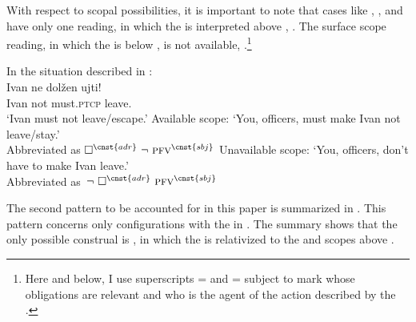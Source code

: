 \documentclass[output=paper,newtxmath,colorlinks,citecolor=brown]{langsci/langscibook}
\begin{document}
       \z

\noindent With respect to scopal possibilities, it is important to note that cases like , , and  have only one reading, in which the  is interpreted above , . The surface scope reading, in which the  is below , is not available, .\footnote{Here and below, I use superscripts  =  and  = subject to mark whose obligations are relevant and who is the agent of the action described by the .
}

\ea \label{relatscope} \ea In the situation described in :\\
	{\gll  Ivan ne dolžen ujti!\\
	Ivan  not must.\textsc{ptcp} {leave.\p} \\
	\glt `Ivan must not leave/escape.'}
	\ex Available scope: `You, officers, must make Ivan  not leave/stay.'\\
    Abbreviated as  $\Box^{\cnst{adr}}\ \neg\ \textsc{pfv}^{\cnst{sbj}}$ \label{relatsca}
    \ex Unavailable scope: `You, officers, don't have to make Ivan leave.'\\
    Abbreviated as  $\,\neg\ \Box^{\cnst{adr}}\  \textsc{pfv}^{\cnst{sbj}}$ \label{relatscu}
	\z \z

\noindent The second pattern to be accounted for in this paper is summarized in . This pattern concerns only configurations with the  in . The summary shows that the only possible construal is , in which the  is relativized to the  and scopes above .


\label{p22}
\z \z
\end{document}
